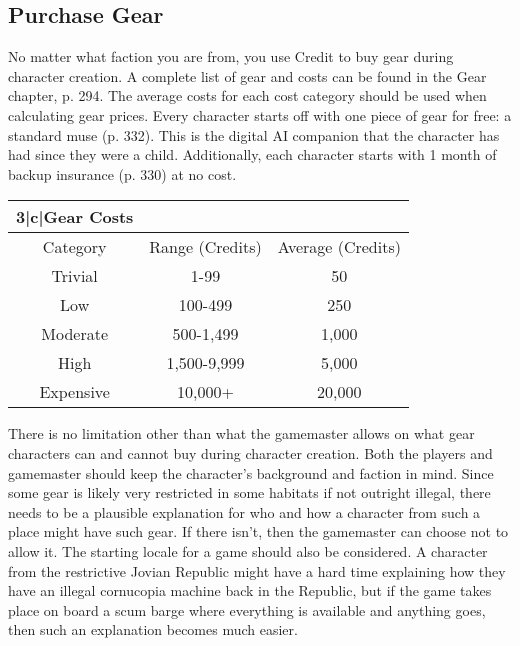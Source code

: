 \subsection{Purchase Gear} \label{sec:purchase-gear} 

No matter what faction you are from, you use Credit to buy gear during character creation. A complete list of gear and costs can be found in the Gear chapter, p. 294. The average costs for each cost category should be used when calculating gear prices. Every character starts off with one piece of gear for free: a standard muse (p. 332). This is the digital AI companion that the character has had since they were a child. Additionally, each character starts with 1 month of backup insurance (p. 330) at no cost. 

\begin{center} \begin{tabular}{|c|c|c|} \hline

\hline{3}{|c|}{Gear Costs} \\ \hline

Category &Range (Credits) &Average (Credits)\\ \hline

Trivial &1-99 &50\\ \hline

Low &100-499 &250\\ \hline

Moderate &500-1,499 &1,000\\ \hline

High &1,500-9,999 &5,000\\ \hline

Expensive &10,000+ &20,000\\ \hline \end{tabular} \end{center} 

There is no limitation other than what the gamemaster allows on what gear characters can and cannot buy during character creation. Both the players and gamemaster should keep the character’s background and faction in mind. Since some gear is likely very restricted in some habitats if not outright illegal, there needs to be a plausible explanation for who and how a character from such a place might have such gear. If there isn’t, then the gamemaster can choose not to allow it. The starting locale for a game should also be considered. A character from the restrictive Jovian Republic might have a hard time explaining how they have an illegal cornucopia machine back in the Republic, but if the game takes place on board a scum barge where everything is available and anything goes, then such an explanation becomes much easier. 


